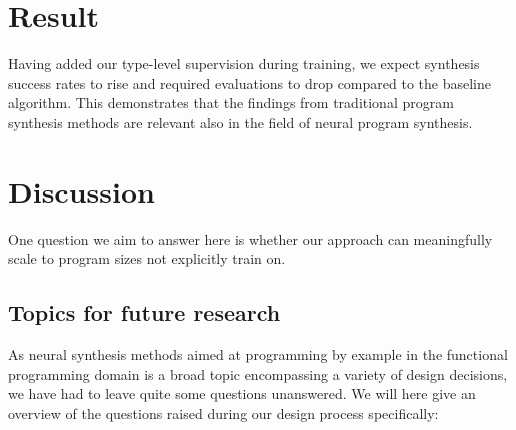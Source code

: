 \documentclass{article}
\begin{document}


\section{Result} %

Having added our type-level supervision during training, we expect synthesis success rates to rise and required evaluations to drop compared to the baseline algorithm.
This demonstrates that the findings from traditional program synthesis methods are relevant also in the field of neural program synthesis.



\section{Discussion} %

One question we aim to answer here is whether our approach can meaningfully scale to program sizes not explicitly train on.

\subsection{Topics for future research}

As neural synthesis methods aimed at programming by example in the functional
programming domain is a broad topic encompassing a variety of design decisions,
we have had to leave quite some questions unanswered.
We will here give an overview of the questions raised during our design process specifically:
\end{document}
